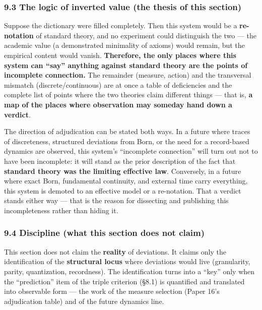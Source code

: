 \documentclass[
]{article}
\begin{document}
\subsubsection{9.3 The logic of inverted value (the thesis of this
section)}\label{the-logic-of-inverted-value-the-thesis-of-this-section}

Suppose the dictionary were filled completely. Then this system would be
a \textbf{re-notation} of standard theory, and no experiment could
distinguish the two --- the academic value (a demonstrated minimality of
axioms) would remain, but the empirical content would vanish.
\textbf{Therefore, the only places where this system can ``say''
anything against standard theory are the points of incomplete
connection.} The remainder (measure, action) and the transversal
mismatch (discrete/continuous) are at once a table of deficiencies and
the complete list of points where the two theories claim different
things --- that is, \textbf{a map of the places where observation may
someday hand down a verdict}.

The direction of adjudication can be stated both ways. In a future where
traces of discreteness, structured deviations from Born, or the need for
a record-based dynamics are observed, this system's ``incomplete
connection'' will turn out not to have been incomplete: it will stand as
the prior description of the fact that \textbf{standard theory was the
limiting effective law}. Conversely, in a future where exact Born,
fundamental continuity, and external time carry everything, this system
is demoted to an effective model or a re-notation. That a verdict stands
either way --- that is the reason for dissecting and publishing this
incompleteness rather than hiding it.

\subsubsection{9.4 Discipline (what this section does not
claim)}\label{discipline-what-this-section-does-not-claim}

This section does not claim the \textbf{reality} of deviations. It
claims only the identification of the \textbf{structural locus} where
deviations would live (granularity, parity, quantization, recordness).
The identification turns into a ``key'' only when the ``prediction''
item of the triple criterion (§8.1) is quantified and translated into
observable form --- the work of the measure selection (Paper 16's
adjudication table) and of the future dynamics line.
\end{document}
